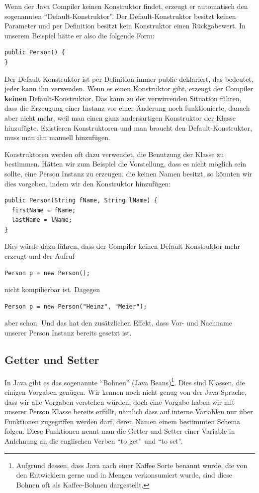 Wenn der Java Compiler keinen Konstruktor findet, erzeugt er automatisch den sogenannten "`Default-Konstruktor"'. Der Default-Konstruktor besitzt keinen Parameter und per Definition besitzt kein Konstruktor einen Rückgabewert. In unserem Beispiel hätte er also die folgende Form:
\begin{lstlisting}
public Person() {
}
\end{lstlisting}
Der Default-Konstruktor ist per Definition immer public deklariert, das bedeutet, jeder kann ihn verwenden. Wenn es einen Konstruktor gibt, erzeugt der Compiler \textbf{keinen} Default-Konstruktor. Das kann zu der verwirrenden Situation führen, dass die Erzeugung einer Instanz vor einer Änderung noch funktionierte, danach aber nicht mehr, weil man einen ganz andersartigen Konstruktor der Klasse hinzufügte. Existieren Konstruktoren und man braucht den Default-Konstruktor, muss man ihn manuell hinzufügen. 

Konstruktoren werden oft dazu verwendet, die Benutzung der Klasse zu bestimmen. Hätten wir zum Beispiel die Vorstellung, dass es nicht möglich sein sollte, eine Person Instanz zu erzeugen, die keinen Namen besitzt, so könnten wir dies vorgeben, indem wir den Konstruktor hinzufügen:
\begin{lstlisting}
public Person(String fName, String lName) {
  firstName = fName;
  lastName = lName;
}
\end{lstlisting}
Dies würde dazu führen, dass der Compiler keinen Default-Konstruktor mehr erzeugt und der Aufruf 
\begin{lstlisting}
Person p = new Person();
\end{lstlisting}
nicht kompilierbar ist. Dagegen
\begin{lstlisting}
Person p = new Person("Heinz", "Meier");
\end{lstlisting}
aber schon. Und das hat den zusätzlichen Effekt, dass Vor- und Nachname unserer Person Instanz bereits gesetzt ist.

\subsection{Getter und Setter}\label{chap:getset}

In Java gibt es das sogenannte "`Bohnen"' (Java Beans)\footnote{Aufgrund dessen, dass Java nach einer Kaffee Sorte benannt wurde, die von den Entwicklern gerne und in Mengen verkonsumiert wurde, sind diese Bohnen oft als Kaffee-Bohnen dargestellt.}. Dies sind Klassen, die einigen Vorgaben genügen. Wir kennen noch nicht genug von der Java-Sprache, dass wir alle Vorgaben verstehen würden, doch eine Vorgabe haben wir mit unserer Person Klasse bereits erfüllt, nämlich dass auf interne Variablen nur über Funktionen zugegriffen werden darf, deren Namen einem bestimmten Schema folgen. Diese Funktionen nennt man die Getter und Setter einer Variable in Anlehnung an die englischen Verben "`to get"' und "`to set"'.

